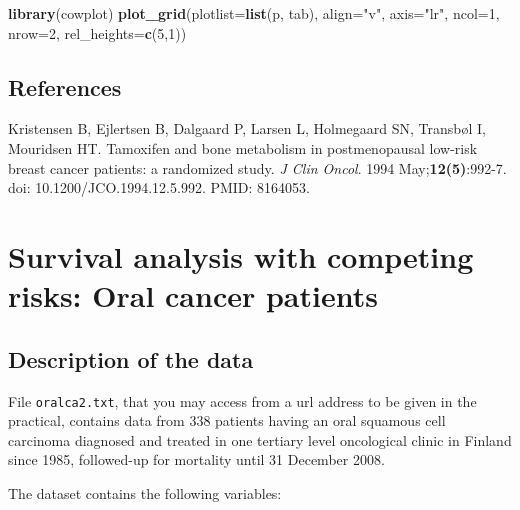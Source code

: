 \documentclass[
]{book}
\newenvironment{Shaded}{\begin{snugshade}}{\end{snugshade}}
\newcommand{\AttributeTok}[1]{\textcolor[rgb]{0.13,0.29,0.53}{#1}}
\newcommand{\DecValTok}[1]{\textcolor[rgb]{0.00,0.00,0.81}{#1}}
\newcommand{\FunctionTok}[1]{\textcolor[rgb]{0.13,0.29,0.53}{\textbf{#1}}}
\newcommand{\NormalTok}[1]{#1}
\newcommand{\StringTok}[1]{\textcolor[rgb]{0.31,0.60,0.02}{#1}}
\begin{document}
\begin{Shaded}
\begin{Highlighting}[]
\FunctionTok{library}\NormalTok{(cowplot)}
\FunctionTok{plot\_grid}\NormalTok{(}\AttributeTok{plotlist=}\FunctionTok{list}\NormalTok{(p, tab), }\AttributeTok{align=}\StringTok{"v"}\NormalTok{, }\AttributeTok{axis=}\StringTok{"lr"}\NormalTok{,}
          \AttributeTok{ncol=}\DecValTok{1}\NormalTok{, }\AttributeTok{nrow=}\DecValTok{2}\NormalTok{, }\AttributeTok{rel\_heights=}\FunctionTok{c}\NormalTok{(}\DecValTok{5}\NormalTok{,}\DecValTok{1}\NormalTok{))}
\end{Highlighting}
\end{Shaded}

\section{References}\label{references}

Kristensen B, Ejlertsen B, Dalgaard P, Larsen L, Holmegaard SN, Transbøl I, Mouridsen HT. Tamoxifen and bone metabolism in postmenopausal low-risk breast cancer patients: a randomized study. \emph{J Clin Oncol}. 1994 May;\textbf{12(5)}:992-7. doi: 10.1200/JCO.1994.12.5.992. PMID: 8164053.

\chapter{Survival analysis with competing risks: Oral cancer patients}\label{survival-analysis-with-competing-risks-oral-cancer-patients}

\section{Description of the data}\label{description-of-the-data}

File \texttt{oralca2.txt}, that you may access from a url address to be given
in the practical, contains data from 338 patients having an oral
squamous cell carcinoma diagnosed and treated in one tertiary level
oncological clinic in Finland since 1985, followed-up for mortality
until 31 December 2008.

The dataset contains the following variables:
\end{document}

